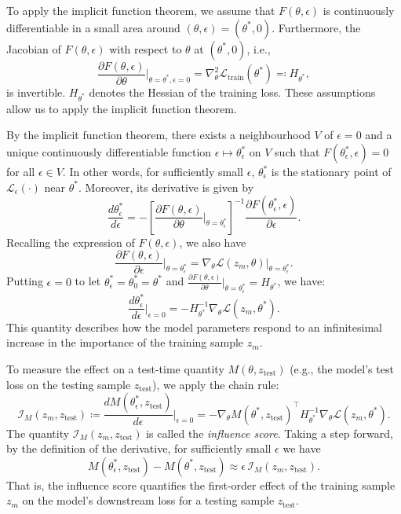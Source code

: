 To apply the implicit function theorem, we assume that $F(\theta, \epsilon)$ is continuously differentiable in a small area around $(\theta, \epsilon) = (\theta^*, 0)$. Furthermore, the Jacobian of $F(\theta, \epsilon)$ with respect to $\theta$ at $(\theta^*, 0)$, i.e.,
\[
\frac{\partial F(\theta, \epsilon)}{\partial \theta}\bigg |_{\theta = \theta^*, \epsilon = 0}
=
\nabla_{\theta}^{2}
\mathcal{L}_{\mathrm{train}}(\theta^*)
\eqqcolon H_{\theta^*},
\]
is invertible. $H_{\theta^*}$ denotes the Hessian of the training loss. These assumptions allow us to apply the implicit function theorem. 

By the implicit function theorem, there exists a neighbourhood $V$ of $\epsilon = 0$ and a unique continuously differentiable function $\epsilon \mapsto \theta^*_{\epsilon}$ on $V$ such that $F(\theta^*_{\epsilon}, \epsilon) = 0$ for all $\epsilon \in V$. In other words, for sufficiently small $\epsilon$, $\theta^*_{\epsilon}$ is the stationary point of $\mathcal{L}_{\epsilon}(\cdot)$ near $\theta^*$. Moreover, its derivative is given by
\[
\frac{d\theta^*_{\epsilon}}{d\epsilon}
=
-
\left[
\frac{\partial F(\theta, \epsilon)}{\partial \theta} \bigg|_{\theta=\theta^*_{\epsilon}}
\right]^{-1}
\frac{\partial F(\theta^*_{\epsilon}, \epsilon)}{\partial \epsilon}.
\]
Recalling the expression of $F(\theta, \epsilon)$, we also have
\[
\frac{\partial F(\theta, \epsilon)}{\partial \epsilon}\bigg|_{\theta=\theta^*_{\epsilon}}
=
\nabla_\theta \mathcal{L}(z_m, \theta)\Big|_{\theta=\theta^*_{\epsilon}}.
\]
Putting $\epsilon = 0$ to let $\theta^*_\epsilon = \theta^*_{0} = \theta^*$ and $\frac{\partial F(\theta, \epsilon)}{\partial \theta} \bigg|_{\theta=\theta^*_{\epsilon}} = H_{\theta^*}$, we have:
\[
\frac{d\theta^*_{\epsilon}}
     {d\epsilon}
\Bigg|_{\epsilon=0}
=
-
H_{\theta^*}^{-1}
\nabla_\theta
\mathcal{L}(z_m,\theta^*).
\]
This quantity describes how the model parameters respond to an infinitesimal increase in the importance of the training sample \(z_m\).

To measure the effect on a test-time quantity $M(\theta, z_{\text{test}})$ (e.g., the model's test loss on the testing sample $z_{\text{test}}$), we apply the chain rule:
\[
\mathcal{I}_{M}(z_m, z_{\text{test}})
\coloneqq
\frac{d M(\theta^*_{\epsilon}, z_{\text{test}})}
     {d\epsilon}
\Bigg|_{\epsilon=0}
=
-
\nabla_\theta M(\theta^*, z_{\text{test}})^\top
H_{\theta^*}^{-1}
\nabla_\theta
\mathcal{L}(z_m,\theta^*).
\]
The quantity $\mathcal{I}_{M}(z_m, z_{\text{test}})$ is called the \emph{influence score}. Taking a step forward, by the definition of the derivative, for sufficiently small $\epsilon$ we have
\[
M(\theta^*_{\epsilon}, z_{\text{test}})
-
M(\theta^*, z_{\text{test}})
\approx
\epsilon
\,\mathcal{I}_{M}(z_m, z_{\text{test}}).
\]
That is, the influence score quantifies the first-order effect of the training sample $z_m$ on the model's downstream loss for a testing sample $z_{\text{test}}$.


